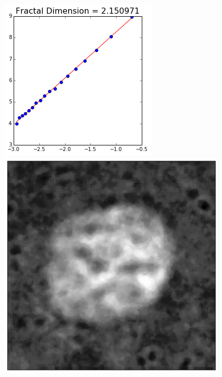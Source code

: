 \begin{figure}[b!]
	\endminipage\hfill
	\centering	
	\includegraphics[width=1\linewidth]{Figures/Chapter3/fdim_0_3.png}
	\endminipage\hfill
	\endminipage\hfill
	\minipage{\textwidth}
	\centering
	\includegraphics[width=1\linewidth]{Figures/Chapter3/fdim_1_1.png}

\end{figure}
